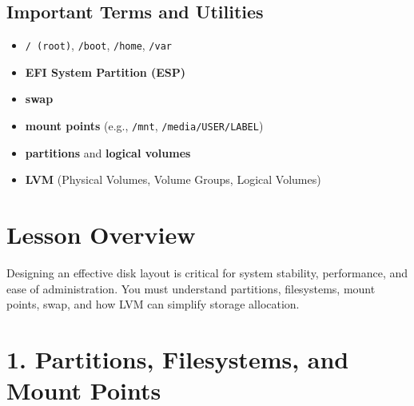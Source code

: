 \documentclass[a4paper]{report}
\begin{document}
\subsection*{Important Terms and Utilities}
\begin{itemize}
    \item \texttt{/ (root)}, \texttt{/boot}, \texttt{/home}, \texttt{/var}
    \item \textbf{EFI System Partition (ESP)}
    \item \textbf{swap}
    \item \textbf{mount points} (e.g., \texttt{/mnt}, \texttt{/media/USER/LABEL})
    \item \textbf{partitions} and \textbf{logical volumes}
    \item \textbf{LVM} (Physical Volumes, Volume Groups, Logical Volumes)
\end{itemize}

\section*{Lesson Overview}

Designing an effective disk layout is critical for system stability, performance, and ease of administration. You must understand partitions, filesystems, mount points, swap, and how LVM can simplify storage allocation.

\section*{1. Partitions, Filesystems, and Mount Points}
\end{document}
